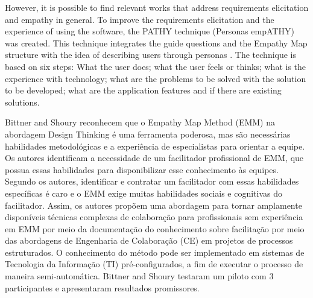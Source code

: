\documentclass[conference]{IEEEtran}
\begin{document}

However, it is possible to find relevant works that address requirements elicitation and empathy in general. To improve the requirements elicitation and the experience of using the software, the PATHY technique (Personas empATHY) \cite{DBLP:conf/sbes/FerreiraCB15} was created. This technique integrates the guide questions and the Empathy Map structure with the idea of describing users through personas \cite{DBLP:conf/sbes/FerreiraCB15}. The technique is based on six steps: What the user does; what the user feels or thinks; what is the experience with technology; what are the problems to be solved with the solution to be developed; what are the application features and if there are existing solutions.

Bittner and Shoury \cite{DBLP:conf/hicss/BittnerS19} reconhecem que o Empathy Map Method (EMM) na abordagem Design Thinking é uma ferramenta poderosa, mas são necessárias habilidades metodológicas e a experiência de especialistas para orientar a equipe. Os autores identificam a necessidade de um facilitador profissional de EMM, que possua essas habilidades para disponibilizar esse conhecimento às equipes. Segundo os autores, identificar e contratar um facilitador com essas habilidades específicas é caro e o EMM exige muitas habilidades sociais e cognitivas do facilitador. Assim, os autores propõem uma abordagem para tornar amplamente disponíveis técnicas complexas de colaboração para profissionais sem experiência em EMM por meio da documentação do conhecimento sobre facilitação por meio das abordagens de Engenharia de Colaboração (CE) em projetos de processos estruturados. O conhecimento do método pode ser implementado em sistemas de Tecnologia da Informação (TI) pré-configurados, a fim de executar o processo de maneira semi-automática. Bittner and Shoury \cite{DBLP:conf/hicss/BittnerS19} testaram um piloto com 3 participantes e apresentaram resultados promissores.
\end{document}
